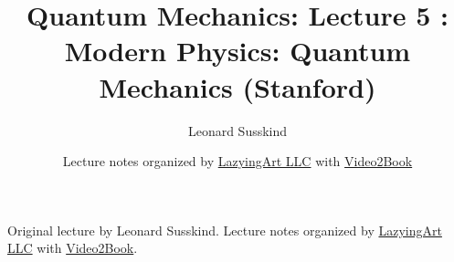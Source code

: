 \documentclass[11pt,oneside]{book}
\begin{document}
\frontmatter
\title{Quantum Mechanics: Lecture 5 : Modern Physics: Quantum Mechanics (Stanford)}
\author{Leonard Susskind}
\date{Lecture notes organized by \href{https://lazying.art}{LazyingArt LLC} with \href{https://github.com/lachlanchen/Video2Book}{Video2Book}}
\maketitle
\begin{center}
\small Original lecture by Leonard Susskind. Lecture notes organized by \href{https://lazying.art}{LazyingArt LLC} with \href{https://github.com/lachlanchen/Video2Book}{Video2Book}.
\end{center}
\clearpage
\mainmatter

\end{document}
